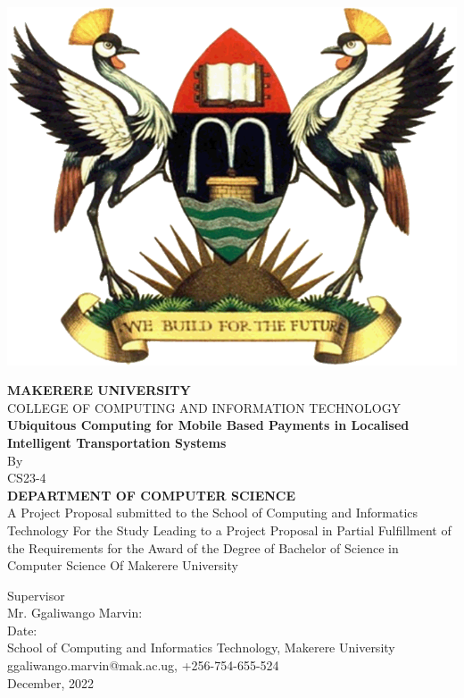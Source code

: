 \documentclass[11pt]{report}
\begin{document}
    \begin{titlepage}
        \begin{center}
            \includegraphics[scale=0.25]{images/muk}

            \textbf{MAKERERE UNIVERSITY}
            \\COLLEGE OF COMPUTING AND INFORMATION TECHNOLOGY
            \vspace{1cm}
            \\{\textbf{ Ubiquitous Computing for Mobile Based Payments in Localised Intelligent Transportation Systems}}
            \vspace{0.5cm}
            \\By
            \\CS23-4
            \vspace{0.5cm}
            \\{\textbf{
                DEPARTMENT OF COMPUTER SCIENCE
            }}
            \vspace{0.5cm}
            \\A Project Proposal submitted to the School of Computing and Informatics Technology
            For the Study Leading to a Project Proposal in Partial Fulfillment of the
            Requirements for the Award of the Degree of Bachelor of Science in Computer Science
            Of Makerere University
            \vspace{0.5cm}

            Supervisor
            \vspace{0.2cm}
            \\Mr. Ggaliwango Marvin:\dotfill
            \vspace{0.2cm}
            \\Date:\dotfill
            \vspace{0.2cm}
            \\School of Computing and Informatics Technology, Makerere University
            \\ggaliwango.marvin@mak.ac.ug, +256-754-655-524
            \\December, 2022
        \end{center}
    \end{titlepage}
\end{document}
